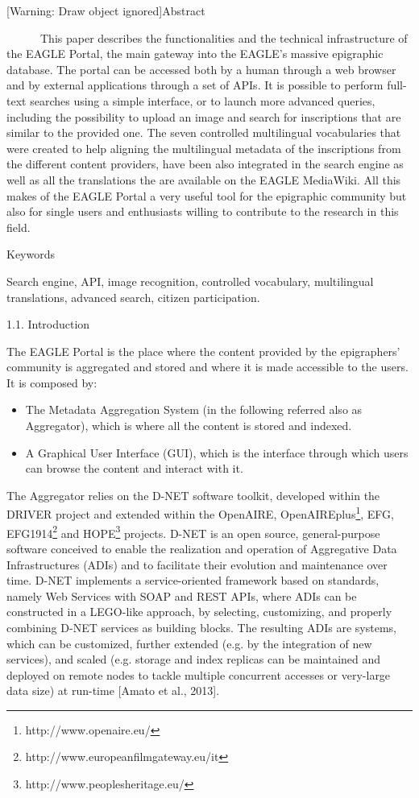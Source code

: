 \documentclass[amsthm,ebook]{saparticle}
\title{}
\author{claudio prandoni}
\date{2015-11-09}
\begin{document}
[Warning: Draw object ignored]Abstract

\ \ \ \ \ \ This paper describes the functionalities and the technical infrastructure of the EAGLE Portal, the main
gateway into the EAGLE’s massive epigraphic database. The portal can be accessed both by a human through a web browser
and by external applications through a set of APIs. It is possible to perform full-text searches using a simple
interface, or to launch more advanced queries, including the possibility to upload an image and search for inscriptions
that are similar to the provided one. The seven controlled multilingual vocabularies that were created to help aligning
the multilingual metadata of the inscriptions from the different content providers, have been also integrated in the
search engine as well as all the translations the are available on the EAGLE MediaWiki. All this makes of the EAGLE
Portal a very useful tool for the epigraphic community but also for single users and enthusiasts willing to contribute
to the research in this field.

Keywords

Search engine, API, image recognition, controlled vocabulary, multilingual translations, advanced search, citizen
participation.

1.1. Introduction

The EAGLE Portal is the place where the content provided by the epigraphers’ community is aggregated and stored and
where it is made accessible to the users. It is composed by:

\begin{itemize}
\item The Metadata Aggregation System (in the following referred also as Aggregator), which is where all the content is
stored and indexed.
\item A Graphical User Interface (GUI), which is the interface through which users can browse the content and interact
with it.
\end{itemize}
The Aggregator relies on the D-NET software toolkit, developed within the DRIVER project and extended within the
OpenAIRE, OpenAIREplus\footnote{http://www.openaire.eu/}, EFG, EFG1914\footnote{http://www.europeanfilmgateway.eu/it}
and HOPE\footnote{http://www.peoplesheritage.eu/} projects. D-NET is an open source, general-purpose software conceived
to enable the realization and operation of Aggregative Data Infrastructures (ADIs) and to facilitate their evolution
and maintenance over time. D-NET implements a service-oriented framework based on standards, namely Web Services with
SOAP and REST APIs, where ADIs can be constructed in a LEGO-like approach, by selecting, customizing, and properly
combining D-NET services as building blocks. The resulting ADIs are systems, which can be customized, further extended
(e.g. by the integration of new services), and scaled (e.g. storage and index replicas can be maintained and deployed
on remote nodes to tackle multiple concurrent accesses or very-large data size) at run-time [Amato et al., 2013].
\end{document}
